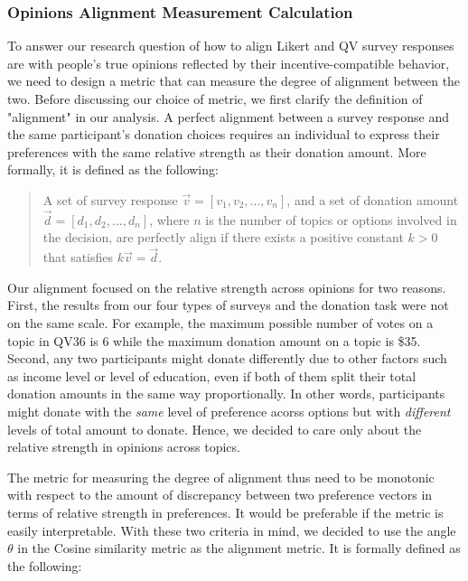 \subsubsection{Opinions Alignment Measurement Calculation}

To answer our research question 
of how to align Likert and QV survey responses are 
with people's true opinions 
reflected by their incentive-compatible behavior, %
we need to design a metric 
that can measure the degree of alignment 
between the two. 
Before discussing our choice of metric, 
we first clarify the definition of "alignment" in our analysis. 
A perfect alignment 
between a survey response 
and the same participant's donation choices
requires an individual to express their preferences
with the same relative strength as their donation amount. 
More formally, it is defined as the following:\par

\begin{quote}
    A set of survey response $\vec{v} = [v_1, v_2, ..., v_n]$, 
    and a set of donation amount $\vec{d} = [d_1, d_2, ..., d_n]$, 
    where $n$ is the number of topics or options involved in the decision, 
    are perfectly align if there exists a positive constant $k>0$ that satisfies $k\vec{v} = \vec{d}$.
\end{quote}

Our alignment focused on the relative strength across opinions for two reasons. 
First, the results from our four types of surveys 
and the donation task were not on the same scale. 
For example, the maximum possible number of votes on a topic 
in QV36 is 6 
while the maximum donation amount on a topic is \$35. 
Second, 
any two participants might donate differently
due to other factors such as income level or level of education,
even if both of them split their total donation amounts in the same way proportionally.
In other words, 
participants might donate with the \textit{same} level of preference acorss options 
but with \textit{different} levels of total amount to donate.
Hence, we decided to care only about the relative strength in opinions across topics.

The metric for measuring the degree of alignment 
thus need to be monotonic 
with respect to the amount of discrepancy 
between two preference vectors 
in terms of relative strength in preferences. 
It would be preferable if the metric is easily interpretable. 
With these two criteria in mind, 
we decided to use the angle $\theta$ in the Cosine similarity metric 
as the alignment metric. 
It is formally defined as the following: \par

